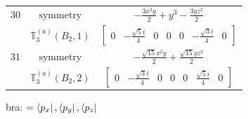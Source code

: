 \documentclass[fleqn,8pt,landscape]{jsarticle}
\begin{document}
\begin{longtable}{ccc}
$ 30 $ & $ \text{symmetry} $ & $ - \frac{3 x^{2} y}{2} + y^{3} - \frac{3 y z^{2}}{2} $ \\
$  $ & $ \mathbb{T}_{3}^{(a)}(B_{2},1) $ & $ \begin{bmatrix} 0 & - \frac{\sqrt{5} i}{4} & 0 & 0 & 0 & - \frac{\sqrt{3} i}{4} & 0 \end{bmatrix} $ \\ \hline
$ 31 $ & $ \text{symmetry} $ & $ - \frac{\sqrt{15} x^{2} y}{2} + \frac{\sqrt{15} y z^{2}}{2} $ \\
$  $ & $ \mathbb{T}_{3}^{(a)}(B_{2},2) $ & $ \begin{bmatrix} 0 & - \frac{\sqrt{3} i}{4} & 0 & 0 & 0 & \frac{\sqrt{5} i}{4} & 0 \end{bmatrix} $ \\ \hline
\end{longtable}
bra: $=\bra{p_{x}}, \bra{p_{y}}, \bra{p_{z}}$
\end{document}
